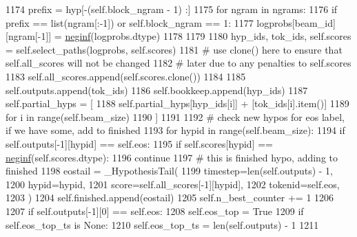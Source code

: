\begin{DoxyCode}
1174                 prefix = hyp[-(self.block\_ngram - 1) :]
1175                 \textcolor{keywordflow}{for} ngram \textcolor{keywordflow}{in} ngrams:
1176                     \textcolor{keywordflow}{if} prefix == list(ngram[:-1]) \textcolor{keywordflow}{or} self.block\_ngram == 1:
1177                         logprobs[beam\_id][ngram[-1]] = \hyperlink{namespaceparlai_1_1utils_1_1torch_a6c6e25115353dba479cd72dc31dc76ae}{neginf}(logprobs.dtype)
1178 
1179 
1180         hyp\_ids, tok\_ids, self.scores = self.select\_paths(logprobs, self.scores)
1181         \textcolor{comment}{# use clone() here to ensure that self.all\_scores will not be changed}
1182         \textcolor{comment}{# later due to any penalties to self.scores}
1183         self.all\_scores.append(self.scores.clone())
1184 
1185         self.outputs.append(tok\_ids)
1186         self.bookkeep.append(hyp\_ids)
1187         self.partial\_hyps = [
1188             self.partial\_hyps[hyp\_ids[i]] + [tok\_ids[i].item()]
1189             \textcolor{keywordflow}{for} i \textcolor{keywordflow}{in} range(self.beam\_size)
1190         ]
1191 
1192         \textcolor{comment}{#  check new hypos for eos label, if we have some, add to finished}
1193         \textcolor{keywordflow}{for} hypid \textcolor{keywordflow}{in} range(self.beam\_size):
1194             \textcolor{keywordflow}{if} self.outputs[-1][hypid] == self.eos:
1195                 \textcolor{keywordflow}{if} self.scores[hypid] == \hyperlink{namespaceparlai_1_1utils_1_1torch_a6c6e25115353dba479cd72dc31dc76ae}{neginf}(self.scores.dtype):
1196                     \textcolor{keywordflow}{continue}
1197                 \textcolor{comment}{#  this is finished hypo, adding to finished}
1198                 eostail = \_HypothesisTail(
1199                     timestep=len(self.outputs) - 1,
1200                     hypid=hypid,
1201                     score=self.all\_scores[-1][hypid],
1202                     tokenid=self.eos,
1203                 )
1204                 self.finished.append(eostail)
1205                 self.n\_best\_counter += 1
1206 
1207         \textcolor{keywordflow}{if} self.outputs[-1][0] == self.eos:
1208             self.eos\_top = \textcolor{keyword}{True}
1209             \textcolor{keywordflow}{if} self.eos\_top\_ts \textcolor{keywordflow}{is} \textcolor{keywordtype}{None}:
1210                 self.eos\_top\_ts = len(self.outputs) - 1
1211 
\end{DoxyCode}
\mbox{\label{classparlai_1_1core_1_1torch__generator__agent_1_1TreeSearch_aced42f37b580f876286b5075ba188b2a}} 
